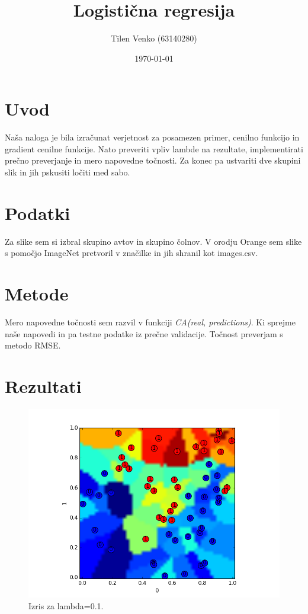 \documentclass[a4paper,11pt]{article}
\title{Logistična regresija}
\author{Tilen Venko (63140280)}
\date{\today}
\begin{document}
\maketitle

\section{Uvod}

Naša naloga je bila izračunat verjetnost za posamezen primer, cenilno funkcijo in gradient cenilne funkcije. Nato preveriti vpliv lambde na rezultate, implementirati prečno preverjanje in mero napovedne točnosti. Za konec pa ustvariti dve skupini slik in jih pskusiti ločiti med sabo.

\section{Podatki}

Za slike sem si izbral skupino avtov in skupino čolnov. V orodju Orange sem slike s pomočjo ImageNet pretvoril v značilke in jih shranil kot images.csv.

\section{Metode}

Mero napovedne točnosti sem razvil v funkciji \textit{CA(real, predictions)}. Ki sprejme naše napovedi in pa testne podatke iz prečne validacije. Točnost preverjam s metodo RMSE.

\section{Rezultati}

\begin{figure}[htbp]
\begin{center}
\includegraphics[scale=0.6]{lambda1.png}
\caption{Izris za lambda=0.1.}
\label{slika1}
\end{center}
\end{figure}
\end{document}
